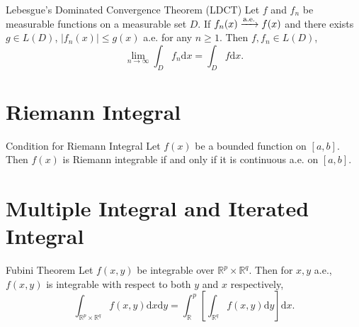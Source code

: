 \begin{theorem}{Lebesgue's Dominated Convergence Theorem (LDCT)}{}
  Let $f$ and $f_n$ be measurable functions on a measurable set $D$.
  If $f_n(x) \xrightarrow{\text{a.e.}} f(x)$ and there exists $g \in L(D)$,
  $|f_n(x)| \leq g(x)$ a.e. for any $n \geq 1$.
  Then $f, f_n \in L(D)$,
  \begin{equation}
    \lim \limits _{n \rightarrow \infty} \int_D f_n\mathrm{d} x
    = \int_D f\mathrm{d}x.
  \end{equation}
\end{theorem}

\section{Riemann Integral}

\begin{theorem}{Condition for Riemann Integral}{}
  Let $f(x)$ be a bounded function on $[a, b]$.
  Then $f(x)$ is Riemann integrable if and only if
  it is continuous a.e. on $[a, b]$.
\end{theorem}

\section{Multiple Integral and Iterated Integral}

\begin{theorem}{Fubini Theorem}{}
  Let $f(x, y)$ be integrable over $\mathbb{R}^p \times \mathbb{R}^q$. Then
  for $x, y$ a.e., $f(x,y)$ is integrable with respect to both $y$ and $x$
  respectively,
  \begin{equation}
    \int_{\mathbb{R}^p \times \mathbb{R}^q} f(x,y)\mathrm{d} x\mathrm{d}y 
    = \int_{\mathbb{R}}^p \left[ \int_{\mathbb{R}^q} f(x,y)\mathrm{d} y \right]\mathrm{d} x.
  \end{equation}
\end{theorem}


